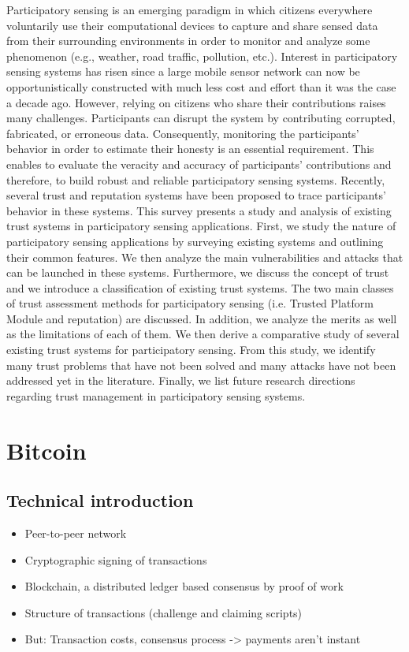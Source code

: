 \documentclass{sig-alternate}
\begin{document}
Participatory sensing is an emerging paradigm in which citizens everywhere voluntarily use their computational devices to capture and share sensed data from their surrounding environments in order to monitor and analyze some phenomenon (e.g., weather, road traffic, pollution, etc.). Interest in participatory sensing systems has risen since a large mobile sensor network can now be opportunistically constructed with much less cost and effort than it was the case a decade ago. However, relying on citizens who share their contributions raises many challenges. Participants can disrupt the system by contributing corrupted, fabricated, or erroneous data. Consequently, monitoring the participants’ behavior in order to estimate their honesty is an essential requirement. This enables to evaluate the veracity and accuracy of participants’ contributions and therefore, to build robust and reliable participatory sensing systems. Recently, several trust and reputation systems have been proposed to trace participants’ behavior in these systems. This survey presents a study and analysis of existing trust systems in participatory sensing applications. First, we study the nature of participatory sensing applications by surveying existing systems and outlining their common features. We then analyze the main vulnerabilities and attacks that can be launched in these systems. Furthermore, we discuss the concept of trust and we introduce a classification of existing trust systems. The two main classes of trust assessment methods for participatory sensing (i.e. Trusted Platform Module and reputation) are discussed. In addition, we analyze the merits as well as the limitations of each of them. We then derive a comparative study of several existing trust systems for participatory sensing. From this study, we identify many trust problems that have not been solved and many attacks have not been addressed yet in the literature. Finally, we list future research directions regarding trust management in participatory sensing systems. \cite{Mousa201549}

\section{Bitcoin}

	\subsection{Technical introduction}

	\begin{itemize}
	\item Peer-to-peer network
	\item Cryptographic signing of transactions
	\item Blockchain, a distributed ledger based consensus by proof of work
	\item Structure of transactions (challenge and claiming scripts)
	\item But: Transaction costs, consensus process -> payments aren't instant
	\end{itemize}
\end{document}
